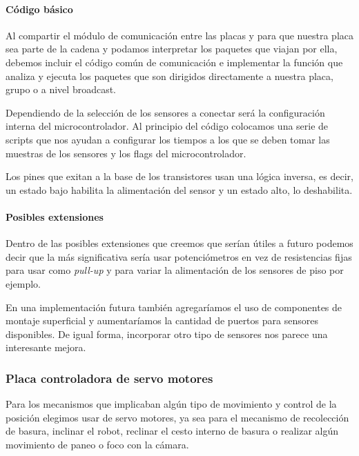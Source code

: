 \paragraph{C\'odigo b\'asico}
\label{h_placas_sensado_codigo}

Al compartir el m\'odulo de comunicaci\'on entre las placas y para que nuestra placa sea parte de la
cadena y podamos interpretar los paquetes que viajan por ella, debemos incluir el c\'odigo com\'un
de comunicaci\'on e implementar la funci\'on que analiza y ejecuta los paquetes que son dirigidos
directamente a nuestra placa, grupo o a nivel broadcast.

Dependiendo de la selecci\'on de los sensores a conectar ser\'a la configuraci\'on interna del microcontrolador.
Al principio del c\'odigo colocamos una serie de scripts que nos ayudan a configurar los tiempos a los que se
deben tomar las muestras de los sensores y los flags del microcontrolador.

Los pines que exitan a la base de los transistores usan una l\'ogica inversa, es decir, un estado bajo habilita
la alimentaci\'on del sensor y un estado alto, lo deshabilita.

\paragraph{Posibles extensiones}
\label{h_placas_sensado_extensiones}

Dentro de las posibles extensiones que creemos que ser\'ian \'utiles a futuro podemos decir que la m\'as
significativa ser\'ia usar potenci\'ometros en vez de resistencias fijas para usar como \emph{pull-up} y
para variar la alimentaci\'on de los sensores de piso por ejemplo.

En una implementaci\'on futura tambi\'en agregar\'iamos el uso de componentes de montaje superficial y
aumentar\'iamos la cantidad de puertos para sensores disponibles.
De igual forma, incorporar otro tipo de sensores nos parece una interesante mejora.

\subsubsection{Placa controladora de servo motores}
\label{h_placas_servos}

Para los mecanismos que implicaban alg\'un tipo de movimiento y control de la posici\'on elegimos usar
de servo motores, ya sea para el mecanismo de recolecci\'on de basura, inclinar el robot, reclinar el
cesto interno de basura o realizar alg\'un movimiento de paneo o foco con la c\'amara.

